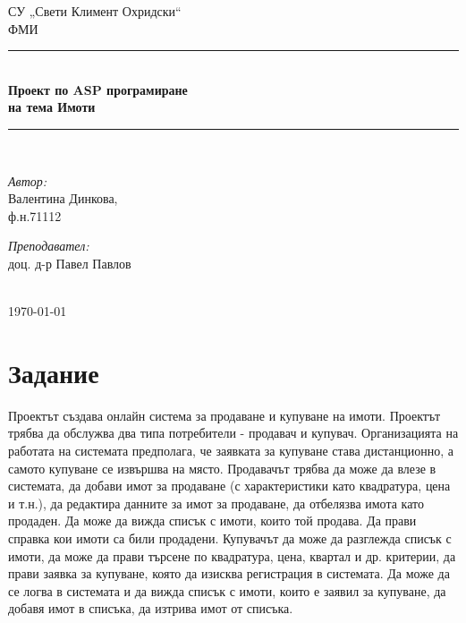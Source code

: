 \documentclass[a4paper,12pt, leqno]{article}
\newcommand{\HRule}{\rule{\linewidth}{0.5mm}}
\begin{document}
\begin{titlepage}
  \begin{center}
СУ „Свети Климент Охридски“ \\
ФМИ
    \\[6cm]
    \HRule \\[0.5cm]

    { \Large \bfseries Проект по ASP програмиране \\ на тема Имоти
    }\\[0.4cm]
    \HRule \\[10cm]


    \begin{minipage}{0.49\textwidth}
      \begin{flushleft} \large
	\emph{Автор:}\\
	Валентина Динкова,\\
	\small ф.н.71112
      \end{flushleft}
    \end{minipage}
    \begin{minipage}{0.49\textwidth}
      \begin{flushright} \large
	\emph{Преподавател:} \\
	доц. д-р Павел Павлов
      \end{flushright}
    \end{minipage}
\\[3cm]
    \vfill
    {\large \today}
  \end{center}
\end{titlepage}

\tableofcontents
\newpage


\section{Задание}
Проектът създава онлайн система за продаване и купуване на имоти. Проектът трябва да обслужва два типа потребители - продавач и купувач. Организацията на работата на системата предполага, че заявката за купуване става дистанционно, а самото купуване се извършва на място.
Продавачът трябва да може да влезе в системата, да добави имот за продаване (с характеристики като квадратура, цена и т.н.), да редактира данните за имот за продаване, да отбелязва имота като продаден. Да може да вижда списък с имоти, които той продава. Да прави справка кои имоти са били продадени.
Купувачът да може да разглежда списък с имоти, да може да прави търсене по квадратура, цена, квартал и др. критерии, да прави заявка за купуване, която да изисква регистрация в системата. Да може да се логва в системата и да вижда списък с имоти, които е заявил за купуване, да добавя имот в списъка, да изтрива имот от списъка. 
\end{document}

